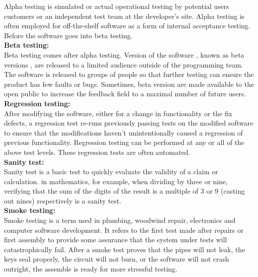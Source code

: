 Alpha testing is simulated or actual operational testing by potential users customers or an independent test team at the developer's 
site. Alpha testing is often employed for off-the-shelf software as a form of internal acceptance testing. Before the software goes 
into beta testing.\\[0.5cm]
\textbf{Beta testing:}\\
\hspace*{0.82cm}Beta testing comes after alpha testing. Version of the software , known as beta versions , are released to a limited 
audience outside of the programming team. The software is released to groups of people so that further testing can ensure the product 
has few faults or bugs. Sometimes, beta version are made available to the open public to increase the feedback field to a maximal 
number of future users.\\[0.5cm]
\textbf{Regression testing:}\\
\hspace*{0.82cm}After modifying the software, either for a change in functionality or the fix defects, a regression test re-runs 
previously passing tests on the modified software to ensure that the modifications haven't unintentionally caused a regression of 
previous functionality. Regression testing can be performed at any or all of the above test levels. These regression tests are 
often automated.\\[0.5cm] 
\textbf{Sanity test:}\\
\hspace*{0.82cm}Sanity test is a basic test to quickly evaluate the validity of a claim or calculation. in mathematics, for example, 
when dividing by three or nine, verifying that the sum of the digits of the result is a multiple of 3 or 9 (casting out nines) 
respectively is a sanity test.\\[0.5cm]
\textbf{Smoke testing:}\\
\hspace*{0.82cm}Smoke testing is a term used in plumbing, woodwind repair, electronics and computer software development. It refers 
to the first test made after repairs or first assembly to provide some assurance that the system under tests will catastrophically 
fail. After a smoke test proves that the pipes will not leak, the keys seal properly, the circuit will not burn, or the software will 
not crash outright, the assemble is ready for more stressful testing.
\newpage
